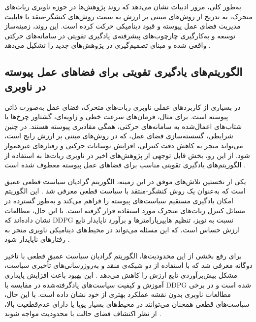 به‌طور کلی، مرور ادبیات نشان می‌دهد که روند پژوهش‌ها در حوزه ناوبری ربات‌های متحرک، به‌ تدریج از روش‌های مبتنی بر ارزش به سمت روش‌های کنشگر-منقد با قابلیت مدیریت فضای عمل پیوسته و قیود دینامیکی حرکت کرده است. این روند، زمینه‌ساز توسعه و به‌کارگیری چارچوب‌های پیشرفته‌ی یادگیری تقویتی در سامانه‌های حرکتی واقعی شده و مبنای تصمیم‌گیری در پژوهش‌های جدید را تشکیل می‌دهد %
\cite{Alsolami2025AutonomousNavigationSurvey}.
\subsection{الگوریتم‌های یادگیری تقویتی برای فضاهای عمل پیوسته در ناوبری}

در بسیاری از کاربردهای عملی ناوبری ربات‌های متحرک، فضای عمل به‌صورت ذاتی پیوسته%
	است. برای مثال، فرمان‌های سرعت خطی و زاویه‌ای، گشتاور چرخ‌ها یا شتاب‌های اعمال‌شده به سامانه‌های حرکتی، همگی مقادیری پیوسته هستند. در چنین شرایطی، گسسته‌سازی فضای عمل، که در روش‌های مبتنی بر ارزش رایج است، می‌تواند منجر به کاهش دقت کنترلی، افزایش نوسانات حرکتی و رفتارهای غیرهموار شود. از این رو، بخش قابل توجهی از پژوهش‌های اخیر در ناوبری ربات‌ها به استفاده از الگوریتم‌های یادگیری تقویتی مناسب برای فضاهای عمل پیوسته معطوف شده است %
\cite{Kober2013RLRobotics,Alsolami2025AutonomousNavigationSurvey}.

یکی از نخستین تلاش‌های موفق در این زمینه، الگوریتم گرادیان سیاست قطعی عمیق%
 است که به‌عنوان یک روش کنشگر-منتقد با سیاست قطعی معرفی شد %
\cite{Lillicrap2016}. %
 این الگوریتم امکان یادگیری مستقیم سیاست‌های پیوسته را فراهم می‌کند و به‌طور گسترده در مسائل کنترل ربات‌های متحرک مورد استفاده قرار گرفته است. با این حال، مطالعات نشان داده‌اند که DDPG نسبت به نویز، تنظیم هایپرپارامترها و برآورد ناپایدار تابع ارزش حساس است، که این مسئله می‌تواند در محیط‌های دینامیکی ناوبری منجر به رفتارهای ناپایدار شود %
\cite{Kober2013RLRobotics}.

برای رفع بخشی از این محدودیت‌ها، الگوریتم گرادیان سیاست عمیق قطعی با تاخیر دوگانه%
 معرفی شد که با استفاده از دو شبکه‌ی منقد و به‌روزرسانی‌های تأخیری سیاست، مشکل بیش‌برآوردی تابع ارزش را کاهش می‌دهد %
\cite{FujimotoTD3}. %
 این بهبود باعث افزایش پایداری آموزش و کیفیت سیاست‌های یادگرفته‌شده در مقایسه با DDPG شده است و در برخی مطالعات ناوبری بدون نقشه عملکرد بهتری از خود نشان داده است. با این حال، سیاست‌های قطعی  همچنان می‌توانند در محیط‌های بسیار پویا یا دارای عدم‌قطعیت بالا، از نظر اکتشاف فضای حالت با محدودیت مواجه شوند %
\cite{Nasti2025MaplessTD3}.

